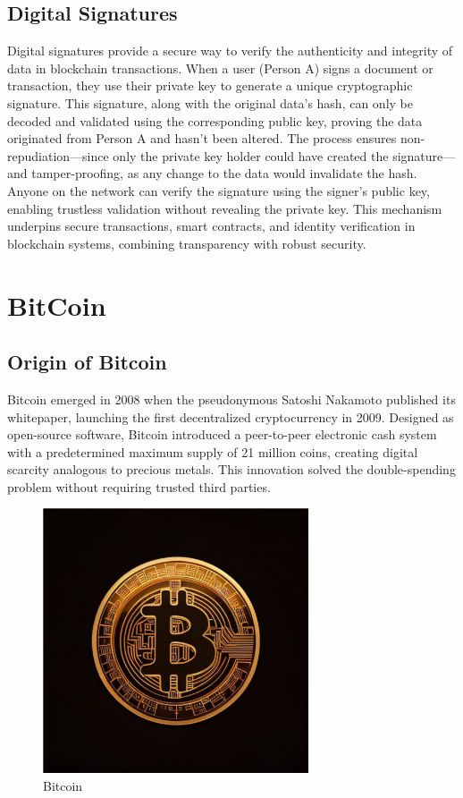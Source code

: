 \documentclass[12pt, a4paper]{article}
\begin{document}
\subsection{Digital Signatures}
Digital signatures provide a secure way to verify the authenticity and integrity of data in blockchain transactions. When a user (Person A) signs a document or transaction, they use their private key to generate a unique cryptographic signature. This signature, along with the original data's hash, can only be decoded and validated using the corresponding public key, proving the data originated from Person A and hasn’t been altered. The process ensures non-repudiation—since only the private key holder could have created the signature—and tamper-proofing, as any change to the data would invalidate the hash. Anyone on the network can verify the signature using the signer’s public key, enabling trustless validation without revealing the private key. This mechanism underpins secure transactions, smart contracts, and identity verification in blockchain systems, combining transparency with robust security.
\section{BitCoin}
\subsection{Origin of Bitcoin}
Bitcoin emerged in 2008 when the pseudonymous Satoshi Nakamoto published its whitepaper, launching the first decentralized cryptocurrency in 2009. Designed as open-source software, Bitcoin introduced a peer-to-peer electronic cash system with a predetermined maximum supply of 21 million coins, creating digital scarcity analogous to precious metals. This innovation solved the double-spending problem without requiring trusted third parties.
\begin{figure}[h]
    \centering
    \includegraphics[width=0.7\textwidth]{bitcoin.png}
    \caption{Bitcoin}
    \label{Bitcoin}
\end{figure}
\end{document}
